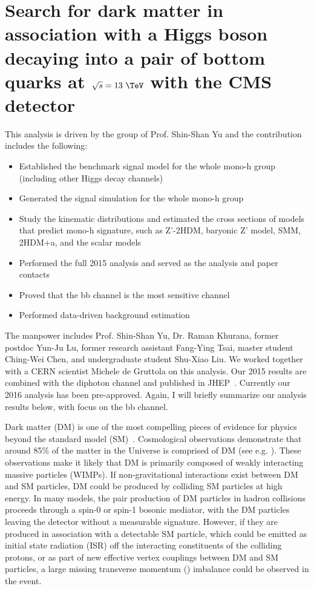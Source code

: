 \section{Search for dark matter in association with a Higgs boson decaying into a pair of bottom quarks at $\sqrt{s} = 13~\TeV$ with the CMS detector \label{sec:monoh}}

This analysis is driven by the group of Prof. Shin-Shan Yu and the contribution includes the following:
\begin{itemize}
\item Established the benchmark signal model for the whole mono-h group (including other Higgs decay channels)
\item Generated the signal simulation for the whole mono-h group
\item Study the kinematic distributions and estimated the cross sections of models that predict mono-h signature, such as Z'-2HDM, baryonic Z' model, SMM, 2HDM+a, and the scalar models
\item Performed the full 2015 analysis and served as the analysis and paper contacts
\item Proved that the bb channel is the most sensitive channel
\item Performed data-driven background estimation
\end{itemize}
The manpower includes Prof. Shin-Shan Yu, Dr. Raman Khurana, former postdoc Yun-Ju Lu, former research assistant Fang-Ying Tsai, master 
student Ching-Wei Chen, and undergraduate student Shu-Xiao Liu. We worked together with a CERN scientist Michele de Gruttola on this 
analysis. Our 2015 results are combined with the diphoton channel and published in JHEP~\cite{Sirunyan:2017hnk}. Currently our 
2016 analysis has been pre-approved. Again, I will briefly summarize our analysis results below, with focus on the bb channel.

Dark matter (DM) is one of the most compelling pieces of evidence for
physics beyond the standard model (SM)~\cite{dm1,dm2,dm3}. Cosmological observations demonstrate that
around 85\% of the matter in the Universe is comprised of DM (see e.g. \cite{planck}). These
observations make it likely that DM is primarily composed of
weakly interacting massive particles (WIMPs). If non-gravitational
interactions exist between DM and SM particles, DM could be produced
by colliding SM particles at high energy. In many models, the pair
production of DM particles in hadron collisions proceeds through a
spin-0 or spin-1 bosonic mediator, with the DM particles leaving the
detector without a measurable signature. However, if they are produced
in association with a detectable SM particle, which could be emitted
as initial state radiation (ISR) off the interacting constituents of the colliding protons, or as part of
new effective vertex couplings between DM and SM particles, a large missing
transverse momentum (\pt) imbalance could be observed in the event. 

